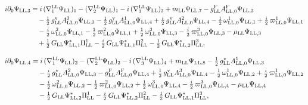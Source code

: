 \documentclass[
  10pt,
]{article}
\begin{document}
\[\begin{aligned}
i\partial_0\Psi_{{\rm LL},3}&=i\,(\nabla^{\rm LL}_1\Psi_{\rm LL})_1-(\nabla^{\rm LL}_2\Psi_{\rm LL})_1-i\,(\nabla^{\rm LL}_3\Psi_{\rm LL})_3+m_{\rm LL}\Psi_{{\rm LL},7}-g^{\rm F}_{\rm LL}A^{\rm F}_{{\rm LL},0}\Psi_{{\rm LL},3}\\
&\quad -\tfrac{1}{2}\,g^{\rm v}_{\rm LL}A^{3}_{{\rm LL},0}\Psi_{{\rm LL},3}-\tfrac{1}{2}\,g^{\rm v}_{\rm LL}A^{1}_{{\rm LL},0}\Psi_{{\rm LL},4}+\tfrac{i}{2}\,g^{\rm v}_{\rm LL}A^{2}_{{\rm LL},0}\Psi_{{\rm LL},4}-\tfrac{1}{2}\,\omega^{1}_{{\rm LL},0}\Psi_{{\rm LL},1}+\tfrac{i}{2}\,\varpi^{1}_{{\rm LL},0}\Psi_{{\rm LL},1}\\
&\quad -\tfrac{i}{2}\,\omega^{2}_{{\rm LL},0}\Psi_{{\rm LL},1}-\tfrac{1}{2}\,\varpi^{2}_{{\rm LL},0}\Psi_{{\rm LL},1}+\tfrac{1}{2}\,\omega^{3}_{{\rm LL},0}\Psi_{{\rm LL},3}-\tfrac{i}{2}\,\varpi^{3}_{{\rm LL},0}\Psi_{{\rm LL},3}-\mu_{\rm LL}\Psi_{{\rm LL},3}\\
&\quad +\tfrac{1}{2}\,G_{\rm LL}\Psi^*_{{\rm LL},1}\Pi^1_{\rm LL}-\tfrac{i}{2}\,G_{\rm LL}\Psi^*_{{\rm LL},1}\Pi^2_{\rm LL}-\tfrac{1}{2}\,G_{\rm LL}\Psi^*_{{\rm LL},2}\Pi^3_{\rm LL},
\end{aligned}\]

\[\begin{aligned}
i\partial_0\Psi_{{\rm LL},4}&=i\,(\nabla^{\rm LL}_1\Psi_{\rm LL})_2-(\nabla^{\rm LL}_2\Psi_{\rm LL})_2-i\,(\nabla^{\rm LL}_3\Psi_{\rm LL})_4+m_{\rm LL}\Psi_{{\rm LL},8}-\tfrac{1}{2}\,g^{\rm v}_{\rm LL}A^{1}_{{\rm LL},0}\Psi_{{\rm LL},3}\\
&\quad -\tfrac{i}{2}\,g^{\rm v}_{\rm LL}A^{2}_{{\rm LL},0}\Psi_{{\rm LL},3}-g^{\rm F}_{\rm LL}A^{\rm F}_{{\rm LL},0}\Psi_{{\rm LL},4}+\tfrac{1}{2}\,g^{\rm v}_{\rm LL}A^{3}_{{\rm LL},0}\Psi_{{\rm LL},4}-\tfrac{1}{2}\,\omega^{1}_{{\rm LL},0}\Psi_{{\rm LL},2}+\tfrac{i}{2}\,\varpi^{1}_{{\rm LL},0}\Psi_{{\rm LL},2}\\
&\quad -\tfrac{i}{2}\,\omega^{2}_{{\rm LL},0}\Psi_{{\rm LL},2}-\tfrac{1}{2}\,\varpi^{2}_{{\rm LL},0}\Psi_{{\rm LL},2}+\tfrac{1}{2}\,\omega^{3}_{{\rm LL},0}\Psi_{{\rm LL},4}-\tfrac{i}{2}\,\varpi^{3}_{{\rm LL},0}\Psi_{{\rm LL},4}-\mu_{\rm LL}\Psi_{{\rm LL},4}\\
&\quad -\tfrac{1}{2}\,G_{\rm LL}\Psi^*_{{\rm LL},2}\Pi^1_{\rm LL}-\tfrac{i}{2}\,G_{\rm LL}\Psi^*_{{\rm LL},2}\Pi^2_{\rm LL}-\tfrac{1}{2}\,G_{\rm LL}\Psi^*_{{\rm LL},1}\Pi^3_{\rm LL},
\end{aligned}\]
\end{document}
